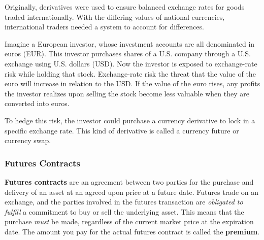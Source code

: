 \documentclass{article}
\begin{document}
    Originally, derivatives were used to ensure balanced exchange rates for goods traded internationally. With the differing values of national currencies, international traders needed a system to account for differences. 

    \begin{example}
      Imagine a European investor, whose investment accounts are all denominated in euros (EUR). This investor purchases shares of a U.S. company through a U.S. exchange using U.S. dollars (USD). Now the investor is exposed to exchange-rate risk while holding that stock. Exchange-rate risk the threat that the value of the euro will increase in relation to the USD. If the value of the euro rises, any profits the investor realizes upon selling the stock become less valuable when they are converted into euros.

      To hedge this risk, the investor could purchase a currency derivative to lock in a specific exchange rate. This kind of derivative is called a currency future or currency swap. 
    \end{example}

    \subsubsection{Futures Contracts}

      \begin{definition}
        \textbf{Futures contracts} are an agreement between two parties for the purchase and delivery of an asset at an agreed upon price at a future date. Futures trade on an exchange, and the parties involved in the futures transaction are \textit{obligated to fulfill} a commitment to buy or sell the underlying asset. This means that the purchase \textit{must} be made, regardless of the current market price at the expiration date. The amount you pay for the actual futures contract is called the \textbf{premium}. 
      \end{definition}
\end{document}
